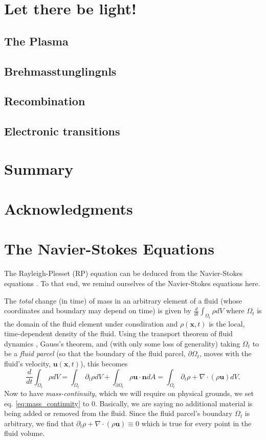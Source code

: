 \documentclass[rmp,aps,nofootinbib,superscriptaddress,floatfix,10pt]{revtex4-2}
\begin{document}
\section{Let there be light!}
\subsection{The Plasma}
\subsection{Brehmasstunglingnls}
\subsection{Recombination}
\subsection{Electronic transitions}

\section{Summary}

\section{Acknowledgments}

\appendix

\section{The Navier-Stokes Equations}
The Rayleigh-Plesset (RP) equation can be deduced from the Navier-Stokes equations \cite{prosperetti1999old,brenner2002single,prosperetti1986bubble,plesset1977bubble,suslick2008inside,yasui2018acoustic}. To that end, we remind ourselves of the Navier-Stokes equations here. 

The \emph{total} change (in time) of mass in an arbitrary element of a fluid (whose coordinates and boundary may depend on time) is given by  $\frac{d}{dt} \int_{\Omega_t} \rho dV$ where $\Omega_t$ is the domain of the fluid element under consdiration and $\rho(\bm{x},t)$ is the local, time-dependent density of the fluid. Using the transport theorem of fluid dynamics \cite{mcdonough2009lectures}, Gauss's theorem, and (with only some loss of generality) taking $\Omega_t$ to be a \emph{fluid parcel} (so that the boundary of the fluid parcel, $\partial \Omega_t$, moves with the fluid's velocity, $\bm{u}(\bm{x},t)$), this becomes
\begin{equation}
    \frac{d}{dt} \int_{\Omega_t} \rho dV = \int_{\Omega_t} \partial_t \rho dV+\int_{\partial \Omega_t} \rho \bm{u} \cdot \bm{n} dA = \int_{\Omega_t} \partial_t \rho+\nabla \cdot(\rho \bm{u})dV.
    \label{eq:mass_continuity}
\end{equation}
Now to have \emph{mass-continuity}, which we will require on physical grounds, we set eq. \ref{eq:mass_continuity} to 0. Basically, we are saying no additional material is being added or removed from the fluid. Since the fluid parcel's boundary $\Omega_t$ is arbitrary, we find that $\partial_t \rho+\nabla\cdot(\rho \bm{u})\equiv 0$ which is true for every point in the fluid volume.
\end{document}
